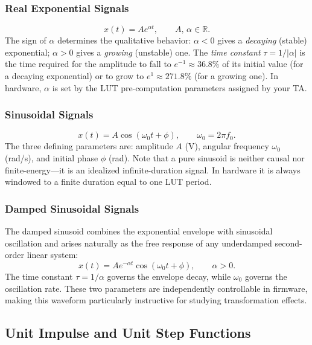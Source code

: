 \documentclass[11pt,letterpaper]{article}
\begin{document}
\subsubsection{Real Exponential Signals}
\begin{equation}
    x(t) = A e^{\alpha t}, \qquad A,\, \alpha \in \mathbb{R}.
\end{equation}
The sign of $\alpha$ determines the qualitative behavior: $\alpha < 0$ gives a \emph{decaying} (stable) exponential; $\alpha > 0$ gives a \emph{growing} (unstable) one. The \emph{time constant} $\tau = 1/|\alpha|$ is the time required for the amplitude to fall to $e^{-1} \approx 36.8\%$ of its initial value (for a decaying exponential) or to grow to $e^{1} \approx 271.8\%$ (for a growing one). In hardware, $\alpha$ is set by the LUT pre-computation parameters assigned by your TA.

\subsubsection{Sinusoidal Signals}
\begin{equation}
    x(t) = A\cos(\omega_0 t + \phi), \qquad \omega_0 = 2\pi f_0.
\end{equation}
The three defining parameters are: amplitude $A$ (V), angular frequency $\omega_0$ (rad/s), and initial phase $\phi$ (rad). Note that a pure sinusoid is neither causal nor finite-energy---it is an idealized infinite-duration signal. In hardware it is always windowed to a finite duration equal to one LUT period.

\subsubsection{Damped Sinusoidal Signals}
The damped sinusoid combines the exponential envelope with sinusoidal oscillation and arises naturally as the free response of any underdamped second-order linear system:
\begin{equation}
    x(t) = A e^{-\alpha t}\cos(\omega_0 t + \phi), \qquad \alpha > 0.
    \label{eq:damped_sine}
\end{equation}
The time constant $\tau = 1/\alpha$ governs the envelope decay, while $\omega_0$ governs the oscillation rate. These two parameters are independently controllable in firmware, making this waveform particularly instructive for studying transformation effects.

\subsection{Unit Impulse and Unit Step Functions}
\end{document}
